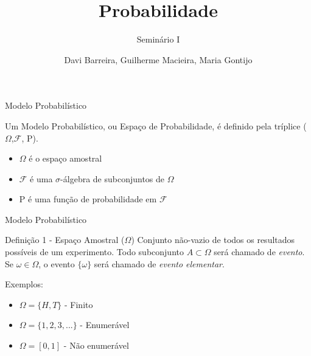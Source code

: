 \documentclass[10pt]{beamer}
\title{Probabilidade}
\subtitle{Seminário I}
\date{}
\author{Davi Barreira, Guilherme Macieira, Maria Gontijo}
\institute{FGV - Escola de Matemática Aplicada}
\begin{document}
\maketitle



\begin{frame}[fragile]{Modelo Probabilístico}

  Um Modelo Probabilístico, ou Espaço de Probabilidade, é definido pela tríplice ($\Omega$,$\mathcal{F}$,
  $\mathrm{P}$).
  \begin{itemize}
  \item $\Omega$ é o espaço amostral
  \item $\mathcal{F}$ é uma $\sigma$-álgebra de subconjuntos de $\Omega$
  \item $\mathrm{P}$ é uma função de probabilidade em $\mathcal{F}$
\end{itemize}
\end{frame}

\begin{frame}[fragile]{Modelo Probabilístico}
\begin{block}{Definição 1 - Espaço Amostral ($\Omega$)}
Conjunto não-vazio de todos os resultados possíveis de um experimento. Todo subconjunto $A \subset \Omega$ será chamado de \textit{evento}. Se $\omega \in \Omega$, o evento $\{\omega\}$ será chamado de \textit{evento elementar}.
\end{block}
\begin{block}{Exemplos:}
\begin{itemize}
    \item $\Omega = \{H,T\}$ - Finito
    \item $\Omega = \{1,2,3,... \}$ - Enumerável
    \item $\Omega = [0,1]$ - Não enumerável
\end{itemize}
\end{block}
\end{frame}
\end{document}
